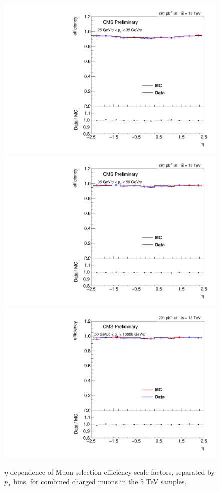 \begin{figure}
\centering
\includegraphics[width=0.32\linewidth]{plots/efficiency/5_zmmsit_combined/PtBins_eta_pt0.pdf}
\includegraphics[width=0.32\linewidth]{plots/efficiency/5_zmmsit_combined/PtBins_eta_pt1.pdf}
\includegraphics[width=0.32\linewidth]{plots/efficiency/5_zmmsit_combined/PtBins_eta_pt2.pdf}
\caption{$\eta$ dependence of Muon selection efficiency scale factors, separated by $p_T$ bins, for combined charged muons in the 5 TeV samples.}
\label{fig:Eff:mu:5:SIT:com}
\end{figure}
